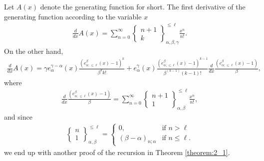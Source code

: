\documentclass[12pt, reqno]{amsart}
\newtheorem{proof 1}{proof 1}
\def\sts#1#2{\begin{Bmatrix}
#1 \\ #2 \end{Bmatrix}}
\begin{document}
Let $A(x)$ denote the generating function for short.  
The first derivative of the generating function according to the variable $x$
\begin{align*}
\frac{d}{dx}A(x) = \sum_{n=0}^{\infty} \sts{n+1}{k}_{\alpha, \beta, \gamma}^{\leq \ell} \frac{x^n}{n!}.
\end{align*}
On the other hand, 
\begin{align*}
\frac{d}{dx}A(x) = \gamma e^{\gamma-\alpha}_{\alpha}(x)\frac{(e^{\beta}_{\alpha;\leq \ell}(x)-1)^k}{\beta^kk!} + e^{\gamma}_{\alpha}(x)\frac{(e^{\beta}_{\alpha;\leq \ell}(x)-1)^{k-1}}{\beta^{(k-1)}(k-1)!}\frac{d}{dx}\frac{(e^{\beta}_{\alpha; \leq \ell}(x)-1)}{\beta},
\end{align*}
where 
\begin{align*}\frac{d}{dx}\frac{(e^{\beta}_{\alpha; \leq \ell}(x)-1)}{\beta} = \sum_{n=0}^{\infty}\sts{n+1}{1}_{\alpha,\beta}^{\leq \ell}\frac{x^n}{n!},
\end{align*}
and since 
\begin{align*}
\sts{n}{1}_{\alpha, \beta}^{\leq \ell} =\left\{\begin{matrix} 0, & \mbox{if  } n>\ell\\
(\beta-\alpha)_{n;\alpha} & \mbox{if  } n\leq \ell.
\end{matrix}\right.
\end{align*} we end up with another proof of the recursion in Theorem \ref{theorem:2_1}. 
\end{document}
